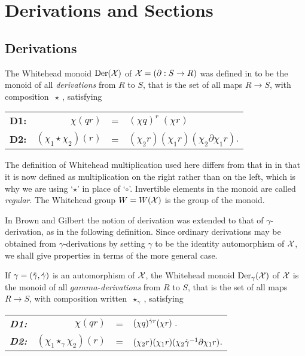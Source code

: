 
\section{Derivations and Sections} \label{sect:der-sec}


\subsection{Derivations} \label{subsec:der} 

The Whitehead monoid  $\mathrm{Der}(\mathcal{X})$  of  
$\mathcal{X} = (\partial : S \to R)$ was defined in \cite{W-48b} 
to be the monoid of all {\it derivations} from $R$ to $S$, 
that is the set of all maps  $R \to S$, with composition  $\ \star \ $, satisfying
\begin{center}
\begin{tabular}{c r c l }
\textbf{D1:}  &  $\chi(qr)$              &  = 
           & $(\chi q)^{r} \; (\chi r)$  \\
\textbf{D2:}  &  $(\chi_1 \star \chi_2)(r)$  &  =
           & $(\chi_2 r)(\chi_1 r)(\chi_2 \partial \chi_1 r)$. 
\end{tabular}
\end{center}

\noindent
The definition of Whitehead multiplication used here 
differs from that in \cite{alp:wens-ijac} in that it is now 
defined as multiplication on the right rather than on the left, 
which is why we are using `$\star$' in place of `$\circ$'. 
Invertible elements in the monoid are called \emph{regular}. 
  
The Whitehead group $W = W(\mathcal{X})$ is the group of the monoid. 

In Brown and Gilbert \cite{brow:gilb} the notion of derivation 
was extended to that of $\gamma$-derivation, as in the following definition. 
Since ordinary derivations may be obtained from $\gamma$-derivations 
by setting $\gamma$ to be the identity automorphism of $\mathcal{X}$, 
we shall give properties in terms of the more general case. 

\begin{defn} 
If $\gamma = (\ddot{\gamma},\dot{\gamma})$ is an automorphism of $\mathcal{X}$,
the Whitehead monoid $\mathrm{Der}_{\gamma}(\mathcal{X})$  of  $\mathcal{X}$ 
is the monoid of all $gamma$-{\it derivations}
from $R$ to $S$, that is the set of all maps  $R \to S$,
with composition written  $\ \star_{\gamma} \ $, satisfying
\begin{center}
\begin{tabular}{c r c l }
\textbf{\emph{D1:}}  &  $\chi(qr)$              &  = 
           & $(\chi q)^{\dot{\gamma} r}(\chi r)~.$  \\
\textbf{\emph{D2:}}  &  $(\chi_1 \star_{\gamma} \chi_2)(r)$  &  =
           & $(\chi_2 r)(\chi_1 r)(\chi_2 \dot{\gamma}^{-1} \partial \chi_1 r)$. 
\end{tabular}
\end{center}
\end{defn}

